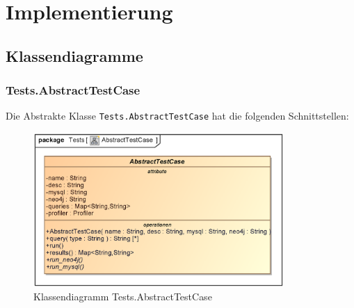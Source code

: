 \section{Implementierung}\label{ch:implementierung}


\subsection{Klassendiagramme}
\subsubsection{Tests.AbstractTestCase}
Die Abstrakte Klasse \verb|Tests.AbstractTestCase| hat die folgenden Schnittstellen:

\begin{figure}[H]
    \myfloatalign
    \includegraphics[width=0.85\textwidth]{gfx/MtGDeepAnalysis/AbstractTestCase.eps}
    \caption{Klassendiagramm Tests.AbstractTestCase}
    \label{fig:class:tests.abstracttestcase}
\end{figure}

